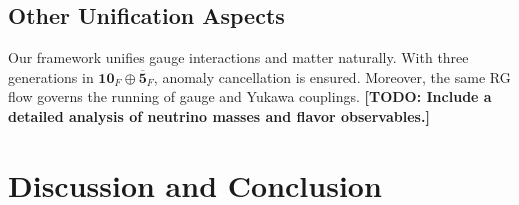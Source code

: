 \documentclass[aps,prd,preprint,groupedaddress]{revtex4-2}
\newcommand{\todo}[1]{\textbf{[TODO: #1]}}
\begin{document}
\subsection{Other Unification Aspects}
Our framework unifies gauge interactions and matter naturally. With three generations in $\mathbf{10}_F\oplus\mathbf{\overline{5}}_F$, anomaly cancellation is ensured. Moreover, the same RG flow governs the running of gauge and Yukawa couplings. \todo{Include a detailed analysis of neutrino masses and flavor observables.}

\section{Discussion and Conclusion}
\label{sec:conclusions}
\end{document}
